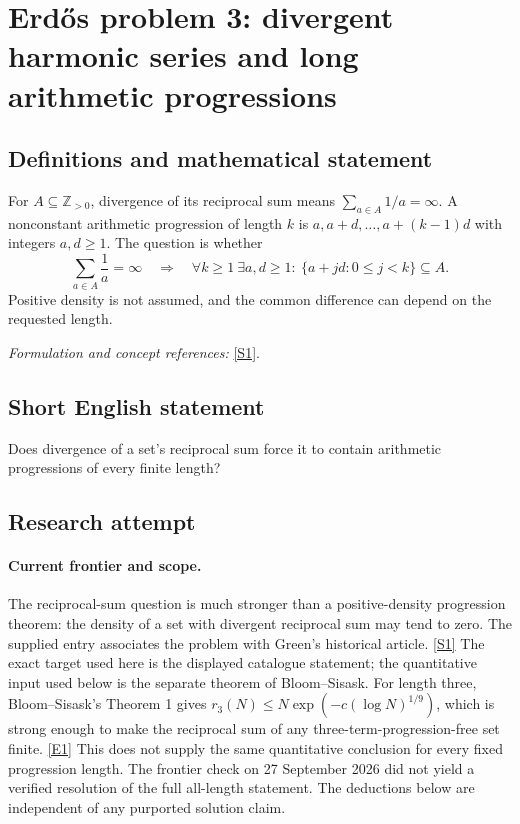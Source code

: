 \documentclass[11pt,a4paper]{article}
\newcommand{\Z}{\mathbb{Z}}
\newcommand{\sref}[2]{\hyperlink{source:#1:#2}{[S#2]}}
\newcommand{\eref}[2]{\hyperlink{extra:#1:#2}{[E#2]}}
\newif\ifshowcatalogue
\newcommand{\cataloguescope}[1]{\ifshowcatalogue
 \paragraph{Exact scope in the supplied catalogue.}
 \begin{quote}\small #1\end{quote}\fi}
\numberwithin{equation}{section}
\begin{document}
\setcounter{section}{129}
\clearpage
\section{\texorpdfstring{Erdős problem 3: divergent harmonic series and long arithmetic progressions}{Erdős problem 3: divergent harmonic series and long arithmetic progressions}}\label{130}
\subsection{Definitions and mathematical statement}
For $A\subseteq\Z_{>0}$, divergence of its reciprocal sum means $\sum_{a\in A}1/a=\infty$. A nonconstant arithmetic progression of length $k$ is $a,a+d,\ldots,a+(k-1)d$ with integers $a,d\ge1$. The question is whether
\[
 \sum_{a\in A}\frac1a=\infty\quad\Longrightarrow\quad
 \forall k\ge1\ \exists a,d\ge1:\ \{a+jd:0\le j<k\}\subseteq A.
\]
Positive density is not assumed, and the common difference can depend on the requested length.
\par\smallskip\textit{Formulation and concept references:} \sref{130}{1}.
\cataloguescope{Determine whether every subset A of the natural numbers whose reciprocal sum diverges must contain arbitrarily long arithmetic progressions.}
\subsection{Short English statement}
Does divergence of a set's reciprocal sum force it to contain arithmetic progressions of every finite length?
\subsection{Research attempt}

\paragraph{Current frontier and scope.}
The reciprocal-sum question is much stronger than a positive-density
progression theorem: the density of a set with divergent reciprocal sum
may tend to zero.  The supplied entry associates the problem with
Green's historical article. \sref{130}{1} The exact target used here is
the displayed catalogue statement; the quantitative input used below
is the separate theorem of Bloom--Sisask.
For length three, Bloom--Sisask's Theorem 1 gives
$r_3(N)\leq N\exp(-c(\log N)^{1/9})$, which is strong enough to make
the reciprocal sum of any three-term-progression-free set finite.
\eref{130}{1}  This does not supply the same quantitative conclusion
for every fixed progression length.  The frontier check on
27 September 2026 did not yield a verified resolution of the full
all-length statement.  The deductions below are independent of any
purported solution claim.
\end{document}
